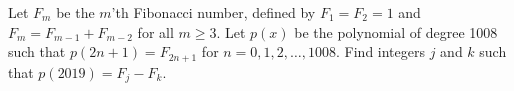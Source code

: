 Let $F_m$ be the $m$'th Fibonacci number, defined by $F_1=F_2=1$ and $F_m = F_{m-1}+F_{m-2}$ for all $m \geq 3$. Let $p(x)$ be the polynomial of degree 1008 such that $p(2n+1)=F_{2n+1}$ for $n=0,1,2,\ldots,1008$. Find integers $j$ and $k$ such that $p(2019) = F_j - F_k$.